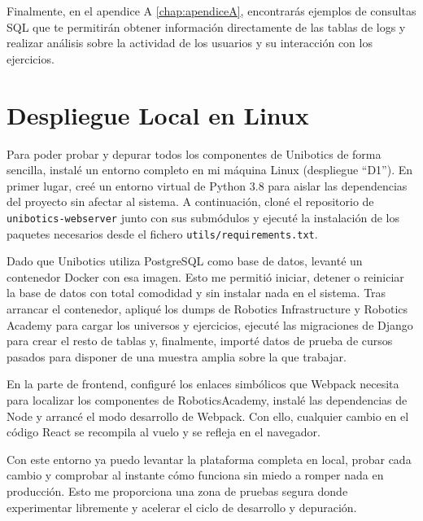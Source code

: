\documentclass[a4paper, 12pt]{book}
\begin{document}
Finalmente, en el apendice A \ref{chap:apendiceA}, encontrarás ejemplos de consultas SQL que te permitirán obtener información directamente de las tablas de logs y realizar análisis sobre la actividad de los usuarios y su interacción con los ejercicios.

\section{Despliegue Local en Linux}

Para poder probar y depurar todos los componentes de Unibotics de forma sencilla, instalé un entorno completo en mi máquina Linux (despliegue “D1”). En primer lugar, creé un entorno virtual de Python 3.8 para aislar las dependencias del proyecto sin afectar al sistema. A continuación, cloné el repositorio de \texttt{unibotics-webserver} junto con sus submódulos y ejecuté la instalación de los paquetes necesarios desde el fichero \texttt{utils/requirements.txt}.  

Dado que Unibotics utiliza PostgreSQL como base de datos, levanté un contenedor Docker con esa imagen. Esto me permitió iniciar, detener o reiniciar la base de datos con total comodidad y sin instalar nada en el sistema. Tras arrancar el contenedor, apliqué los dumps de Robotics Infrastructure y Robotics Academy para cargar los universos y ejercicios, ejecuté las migraciones de Django para crear el resto de tablas y, finalmente, importé datos de prueba de cursos pasados para disponer de una muestra amplia sobre la que trabajar.

En la parte de frontend, configuré los enlaces simbólicos que Webpack necesita para localizar los componentes de RoboticsAcademy, instalé las dependencias de Node y arrancé el modo desarrollo de Webpack. Con ello, cualquier cambio en el código React se recompila al vuelo y se refleja en el navegador.

Con este entorno ya puedo levantar la plataforma completa en local, probar cada cambio y comprobar al instante cómo funciona sin miedo a romper nada en producción. Esto me proporciona una zona de pruebas segura donde experimentar libremente y acelerar el ciclo de desarrollo y depuración.


\cleardoublepage


\end{document}
